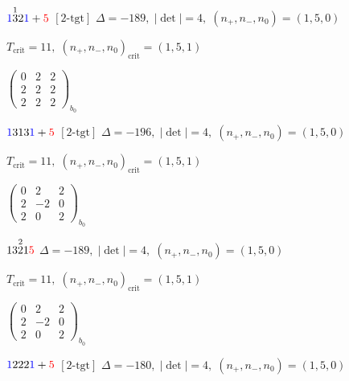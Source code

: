 \documentclass[10pt]{article}
\begin{document}
\smallskip

$\textcolor{blue}{1}\overset{1}{3}2\textcolor{blue}{1}+\textcolor{red}{5}$ $\scriptstyle [2\text{-tgt}]$ \quad $\Delta=-189,\; |\det|=4,\; (n_+,n_-,n_0)=(1,5,0)$

\hspace{1em}$T_{\text{crit}}=11,\; (n_+,n_-,n_0)_{\text{crit}}=(1,5,1)$

\hspace{2em}$\left(\begin{smallmatrix}0 & 2 & 2 \\ 2 & 2 & 2 \\ 2 & 2 & 2\end{smallmatrix}\right)_{\!b_0}$

\smallskip

$\textcolor{blue}{1}313\textcolor{blue}{1}+\textcolor{red}{5}$ $\scriptstyle [2\text{-tgt}]$ \quad $\Delta=-196,\; |\det|=4,\; (n_+,n_-,n_0)=(1,5,0)$

\hspace{1em}$T_{\text{crit}}=11,\; (n_+,n_-,n_0)_{\text{crit}}=(1,5,1)$

\hspace{2em}$\left(\begin{smallmatrix}0 & 2 & 2 \\ 2 & -2 & 0 \\ 2 & 0 & 2\end{smallmatrix}\right)_{\!b_0}$

\smallskip

$13\overset{2}{2}1\textcolor{red}{5}$ \quad $\Delta=-189,\; |\det|=4,\; (n_+,n_-,n_0)=(1,5,0)$

\hspace{1em}$T_{\text{crit}}=11,\; (n_+,n_-,n_0)_{\text{crit}}=(1,5,1)$

\hspace{2em}$\left(\begin{smallmatrix}0 & 2 & 2 \\ 2 & -2 & 0 \\ 2 & 0 & 2\end{smallmatrix}\right)_{\!b_0}$

\smallskip

$\textcolor{blue}{1}222\textcolor{blue}{1}+\textcolor{red}{5}$ $\scriptstyle [2\text{-tgt}]$ \quad $\Delta=-180,\; |\det|=4,\; (n_+,n_-,n_0)=(1,5,0)$
\end{document}
